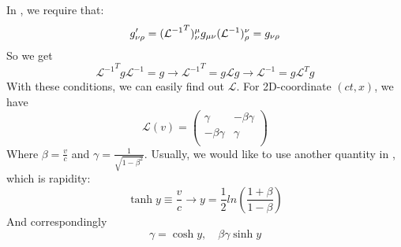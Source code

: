 In \SR{}, we require that:
\[
    g'_{\nu\rho}=({\mathcal{L}^{-1}}^T)_\nu^{\mu}g_{\mu\nu}(\mathcal{L}^{-1})^\nu_{\rho}=g_{\nu\rho}
\]
So we get
\[
    {\mathcal{L}^{-1}}^Tg\mathcal{L}^{-1}=g \rightarrow {\mathcal{L}^{-1}}^T=g\mathcal{L}g \rightarrow \mathcal{L}^{-1}=g\mathcal{L}^Tg
\]
With these conditions, we can easily find out $\mathcal{L}$. For 2D-coordinate $(ct, x)$, we have
\[
    \mathcal{L}(v) = 
	\begin{pmatrix}
	    \gamma  &	-\beta\gamma	\\
	    -\beta\gamma    & \gamma	\\
	\end{pmatrix}
\]
Where $\beta=\frac{v}{c}$ and $\gamma=\frac{1}{\sqrt{1-\beta^2}}$. 
Usually, we would like to use another quantity in \SR{}, which is rapidity:
\[
    \tanh{y}\equiv\frac{v}{c} \rightarrow y=\frac{1}{2}ln(\frac{1+\beta}{1-\beta})
\]
And correspondingly
\[
    \gamma=\cosh{y}, \quad \beta\gamma\sinh{y}
\]
